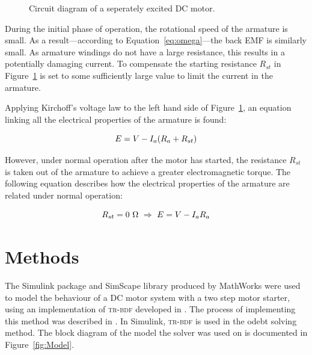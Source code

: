 \documentclass[a4paper,10pt]{article}
\newcommand{\Ohm}{\si{\ohm}\xspace}
\begin{document}
\begin{figure}[h]
    \centering
    \def\svgwidth{0.6\textwidth}
    
    \caption{Circuit diagram of a seperately excited DC motor.}
    \label{fig:Circuit}
\end{figure}

During the initial phase of operation, the rotational speed of the armature is 
small. As a result---according to Equation~\ref{eq:omega}---the back EMF is 
similarly small. As armature windings do not have a large resistance, this 
results in a potentially damaging current. To compensate the starting 
resistance $R_{st}$ in  Figure~\ref{fig:Circuit} is set to some sufficiently 
large value to limit the current in the armature.

Applying Kirchoff's voltage law to the left hand side of 
Figure~\ref{fig:Circuit}, an equation linking all the electrical properties of 
the armature is found:

\begin{equation}  \label{eq:ERst}
    E = V - I_a(R_a + R_{st}) \\
\end{equation}

However, under normal operation after the motor has started, the resistance 
$R_{st}$ is taken out of the armature to achieve a greater electromagnetic 
torque. The following equation describes how the electrical properties of the 
armature are related under normal operation:

\begin{equation}  \label{eq:E}
    R_{st} = 0~\Ohm ~\Rightarrow~ E = V - I_a R_a \\
\end{equation}

\section{Methods}

The Simulink package and SimScape library produced by MathWorks were used to 
model the behaviour of a DC motor system with a two step motor starter, using 
an implementation of \textsc{tr-bdf} developed in 
\cite{bank1985transient}. The process of implementing this method was described 
in \cite{hosea1996analysis}. In Simulink, \textsc{tr-bdf} is 
used 
in the odebt solving method. The block diagram of the model 
the solver was 
used on is documented in Figure~\vref{fig:Model}. 
\end{document}
